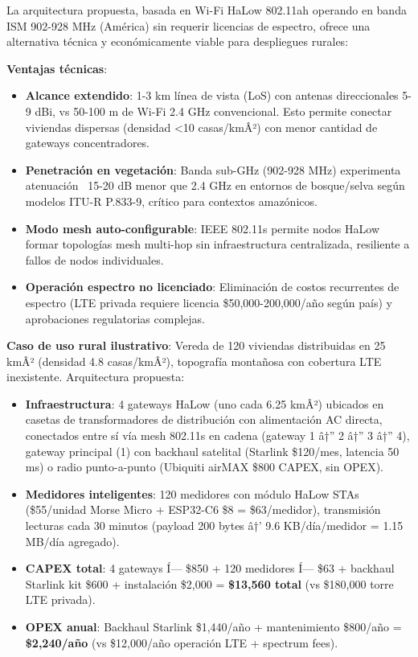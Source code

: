 La arquitectura propuesta, basada en Wi-Fi HaLow 802.11ah operando en banda ISM 902-928 MHz (América) sin requerir licencias de espectro, ofrece una alternativa técnica y económicamente viable para despliegues rurales:

\textbf{Ventajas técnicas}:
\begin{itemize}
    \item \textbf{Alcance extendido}: 1-3 km línea de vista (LoS) con antenas direccionales 5-9 dBi, vs 50-100 m de Wi-Fi 2.4 GHz convencional. Esto permite conectar viviendas dispersas (densidad <10 casas/kmÂ²) con menor cantidad de gateways concentradores.
    \item \textbf{Penetración en vegetación}: Banda sub-GHz (902-928 MHz) experimenta atenuación ~15-20 dB menor que 2.4 GHz en entornos de bosque/selva según modelos ITU-R P.833-9, crítico para contextos amazónicos.
    \item \textbf{Modo mesh auto-configurable}: IEEE 802.11s permite nodos HaLow formar topologías mesh multi-hop sin infraestructura centralizada, resiliente a fallos de nodos individuales.
    \item \textbf{Operación espectro no licenciado}: Eliminación de costos recurrentes de espectro (LTE privada requiere licencia \$50,000-200,000/año según país) y aprobaciones regulatorias complejas.
\end{itemize}

\textbf{Caso de uso rural ilustrativo}: Vereda de 120 viviendas distribuidas en 25 kmÂ² (densidad 4.8 casas/kmÂ²), topografía montañosa con cobertura LTE inexistente. Arquitectura propuesta:
\begin{itemize}
    \item \textbf{Infraestructura}: 4 gateways HaLow (uno cada 6.25 kmÂ²) ubicados en casetas de transformadores de distribución con alimentación AC directa, conectados entre sí vía mesh 802.11s en cadena (gateway 1 â†” 2 â†” 3 â†” 4), gateway principal (1) con backhaul satelital (Starlink \$120/mes, latencia 50 ms) o radio punto-a-punto (Ubiquiti airMAX \$800 CAPEX, sin OPEX).
    \item \textbf{Medidores inteligentes}: 120 medidores con módulo HaLow STAs (\$55/unidad Morse Micro + ESP32-C6 \$8 = \$63/medidor), transmisión lecturas cada 30 minutos (payload 200 bytes â†’ 9.6 KB/día/medidor = 1.15 MB/día agregado).
    \item \textbf{CAPEX total}: 4 gateways Í— \$850 + 120 medidores Í— \$63 + backhaul Starlink kit \$600 + instalación \$2,000 = \textbf{\$13,560 total} (vs \$180,000 torre LTE privada).
    \item \textbf{OPEX anual}: Backhaul Starlink \$1,440/año + mantenimiento \$800/año = \textbf{\$2,240/año} (vs \$12,000/año operación LTE + spectrum fees).
\end{itemize}

